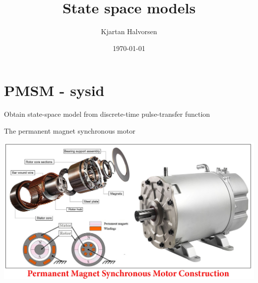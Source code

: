 \documentclass[presentation,aspectratio=1610]{beamer}
\author{Kjartan Halvorsen}
\date{\today}
\title{State space models}
\begin{document}
\maketitle



\section{PMSM - sysid}
\label{sec:orga9605c3}

\begin{frame}[label={sec:orgfef55c8}]{Obtain state-space model from discrete-time pulse-transfer function}
\end{frame}

\begin{frame}[label={sec:org19ac69e}]{The permanent magnet synchronous motor}
\begin{center}
\includegraphics[width=0.9\linewidth]{../../figures/permanent-motor.jpg}
\end{center}
\end{frame}
\end{document}
